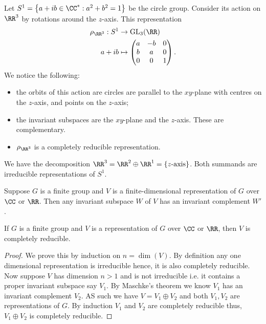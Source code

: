 \documentclass[12pt, a4paper]{article}
\newcommand{\gl}{\text{GL}}
\begin{document}
\begin{mdexample}
    Let \(S^1 =\left\{ a+ib \in \CC^* : a^2+b^2=1 \right\}\) be the circle group. Consider its action on \(\RR^3\) by rotations around the \(z\)-axis. This representation 
    \[\begin{aligned}
        \rho_{\RR^3} :S^1&\to \gl_3(\RR) \\
        a+ib&\mapsto \begin{pmatrix}
            a & -b & 0 \\ b & a & 0 \\ 0 & 0 & 1
        \end{pmatrix}.
    \end{aligned}\]
    We notice the following:
    \begin{itemize}
        \item the orbits of this action are circles are parallel to the \(xy\)-plane with centres on the \(z\)-axis, and points on the \(z\)-axis;
        \item the invariant subspaces are the \(xy\)-plane and the \(z\)-axis. These are complementary.
        \item \(\rho_{\RR^3}\) is a completely reducible representation.
    \end{itemize}
    We have the decomposition \(\RR^3 = \RR^2 \oplus \RR^1 = \{z\text{-axis}\}\). Both summands are irreducible representations of \(S^1\).
\end{mdexample}

\begin{mdthm}
    Suppose \(G\) is a finite group and \(V\) is a finite-dimensional representation of \(G\) over \(\CC\) or \(\RR\). Then any invariant subspace \(W\) of \(V\) has an invariant complement \(W'\).
\end{mdthm}

\begin{corollary}
    If \(G\) is a finite group and \(V\) is a representation of \(G\) over \(\CC\) or \(\RR\), then \(V\) is completely reducible.
\end{corollary}

\begin{proof}
    We prove this by induction on \(n=\dim(V)\). By definition any one dimensional representation is irreducible hence, it is also completely reducible. Now suppose \(V\) has dimension \(n>1\) and is not irreducible i.e. it contains a proper invariant subspace say \(V_1\). By Maschke's theorem we know \(V_1\) has an invariant complement \(V_2\). AS such we have \(V = V_1 \oplus V_2\) and both \(V_1,V_2\) are representations of \(G\). By induction \(V_1\) and \(V_2\) are completely reducible thus, \(V_1\oplus V_2\) is completely reducible.
\end{proof}
\end{document}
